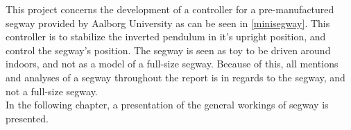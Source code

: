 This project concerns the development of a controller for a pre-manufactured segway provided by Aalborg University as can be seen in \autoref{minisegway}. This controller is to stabilize the inverted pendulum in it's upright position, and control the segway's position. The segway is seen as toy to be driven around indoors, and not as a model of a full-size segway. Because of this, all mentions and analyses of a segway throughout the report is in regards to the segway, and not a full-size segway.\\
In the following chapter, a presentation of the general workings of segway is presented.






%
%
%
